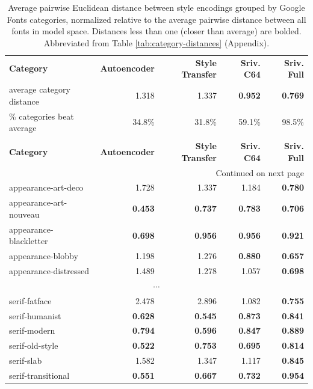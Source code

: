 \begin{longtable}{|l|r|r|r|r|}
\caption{Average pairwise Euclidean distance between style encodings grouped by Google Fonts categories, normalized relative to the average pairwise distance between all fonts in model space. Distances less than one (closer than average) are bolded. Abbreviated from Table \ref{tab:category-distances} (Appendix).}
\label{tab:category-distances-short} \\
\hline
\textbf{Category} & \textbf{Autoencoder} & \textbf{Style Transfer} & \textbf{Sriv. C64} & \textbf{Sriv. Full} \\
\hhline{|=====|}
average category distance & 1.318 & 1.337 & \textbf{0.952} & \textbf{0.769} \\
\% categories beat average & 34.8\% & 31.8\% & 59.1\% & 98.5\% \\
\hhline{|=====|}
\endfirsthead

\multicolumn{5}{c}{{Table \thetable\ continued from previous page}} \\[0.5em]
\hline
\textbf{Category} & \textbf{Autoencoder} & \textbf{Style Transfer} & \textbf{Sriv. C64} & \textbf{Sriv. Full} \\
\hline
\endhead

\hline \multicolumn{5}{r}{{Continued on next page}} \\
\endfoot

\hline
\endlastfoot

appearance-art-deco       & 1.728          & 1.337          & 1.184          & \textbf{0.780} \\
appearance-art-nouveau    & \textbf{0.453} & \textbf{0.737} & \textbf{0.783} & \textbf{0.706} \\
appearance-blackletter    & \textbf{0.698} & \textbf{0.956} & \textbf{0.956} & \textbf{0.921} \\
appearance-blobby         & 1.198          & 1.276          & \textbf{0.880} & \textbf{0.657} \\
appearance-distressed     & 1.489          & 1.278          & 1.057          & \textbf{0.698} \\
\hline
\multicolumn{5}{|c|}{$\cdots$} \\
\hline
serif-fatface             & 2.478          & 2.896          & 1.082          & \textbf{0.755} \\
serif-humanist            & \textbf{0.628} & \textbf{0.545} & \textbf{0.873} & \textbf{0.841} \\
serif-modern              & \textbf{0.794} & \textbf{0.596} & \textbf{0.847} & \textbf{0.889} \\
serif-old-style           & \textbf{0.522} & \textbf{0.753} & \textbf{0.695} & \textbf{0.814} \\
serif-slab                & 1.582          & 1.347          & 1.117          & \textbf{0.845} \\
serif-transitional        & \textbf{0.551} & \textbf{0.667} & \textbf{0.732} & \textbf{0.954} \\

\end{longtable}

